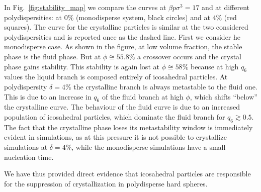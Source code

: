 \documentclass[twocolumn,superscriptaddress]{revtex4-1}
\begin{document}
In Fig.~\ref{fig:stability_map}
we compare the curves at $\beta p\sigma^3=17$ and at different polydispersities:
at $0\%$ (monodisperse system, black circles) and at $4\%$ (red squares). The curve for the
crystalline particles is similar at the two considered polydispersities and is reported once
as the dashed line. First we consider he monodisperse case. As shown in the figure,
at low volume fraction, the stable phase is the fluid phase. But at $\phi\cong 55.8\%$ a crossover
occurs and the crystal phase gains stability. This stability is again lost at $\phi\cong 58\%$
because at high $q_6$ values the liquid branch is composed entirely of icosahedral particles.
At polydispersity $\delta=4\%$ the crystalline branch is always metastable to the fluid one.
This is due to an increase in $q_6$ of the fluid branch at high $\phi$, which shifts ``below'' the
crystalline curve. The behaviour of the fluid curve is due to an increased population of
icosahedral particles, which dominate the fluid branch for $q_6\gtrsim 0.5$. The fact that
the crystalline phase loses its metastability window is immediately evident in simulations,
as at this pressure it is not possible to crystallize simulations at $\delta=4\%$, while the
monodisperse simulations have a small nucleation time.

We have thus provided direct evidence that icosahedral particles are responsible for the suppression
of crystallization in polydisperse hard spheres.






\end{document}
